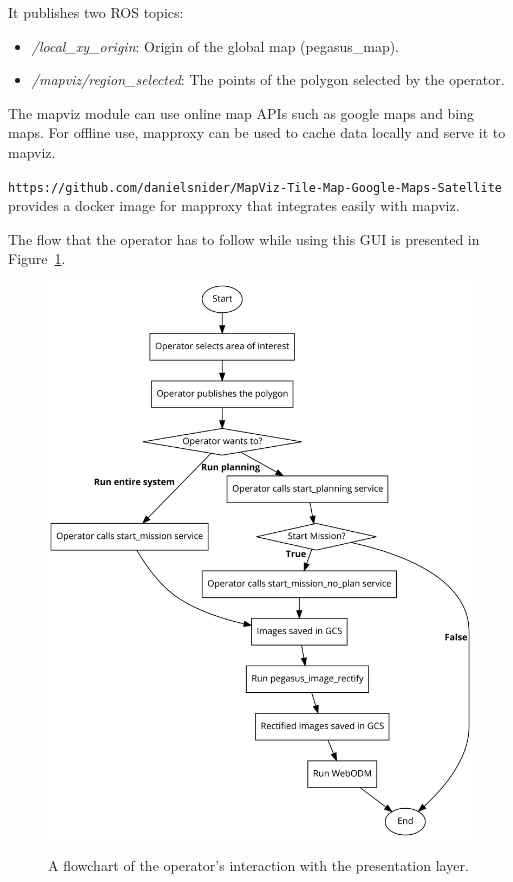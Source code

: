 It publishes two ROS topics:
\begin{itemize}
	\item \textit{/local\_xy\_origin}: Origin of the global map (pegasus\_map).
	\item \textit{/mapviz/region\_selected}: The points of the polygon selected by the operator.
\end{itemize}

The mapviz module can use online map APIs such as google maps and bing maps. For offline use, mapproxy can be used to cache data locally and serve it to mapviz.

\texttt{https://github.com/danielsnider/MapViz-Tile-Map-Google-Maps-Satellite} provides a docker image for mapproxy that integrates easily with mapviz.

The flow that the operator has to follow while using this GUI is presented in Figure~\ref{fig:presentation-flow}.

\begin{figure}
	\centering
	\caption[Operator interaction with pegasus system]{\small A flowchart of the operator's interaction with the presentation layer.}
	\includegraphics[width=5in]{figures/methodology/presentation/presentation-flow}
	\label{fig:presentation-flow}
\end{figure}


